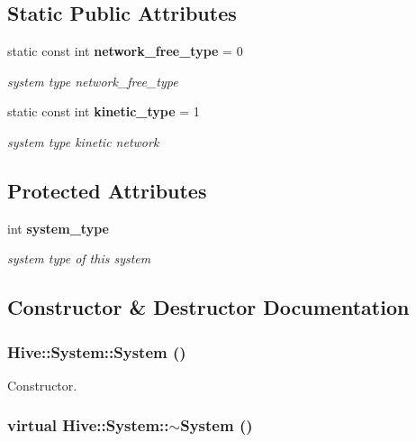 \subsection*{Static Public Attributes}
\begin{CompactItemize}
\item 
static const int {\bf network\_\-free\_\-type} = 0
\begin{CompactList}\small\item\em system type network\_\-free\_\-type \item\end{CompactList}\item 
static const int {\bf kinetic\_\-type} = 1
\begin{CompactList}\small\item\em system type kinetic network \item\end{CompactList}\end{CompactItemize}
\subsection*{Protected Attributes}
\begin{CompactItemize}
\item 
int {\bf system\_\-type}
\begin{CompactList}\small\item\em system type of this system \item\end{CompactList}\end{CompactItemize}


\subsection{Constructor \& Destructor Documentation}
\subsubsection[System]{\setlength{\rightskip}{0pt plus 5cm}Hive::System::System ()}\label{classHive_1_1System_97d30519de767922d0c68e6aea779bf0}


Constructor. 

\subsubsection[$\sim$System]{\setlength{\rightskip}{0pt plus 5cm}virtual Hive::System::$\sim$System ()\hspace{0.3cm}{\tt  [pure virtual]}}\label{classHive_1_1System_12d5b725a07e08b97142fae1fae85474}


